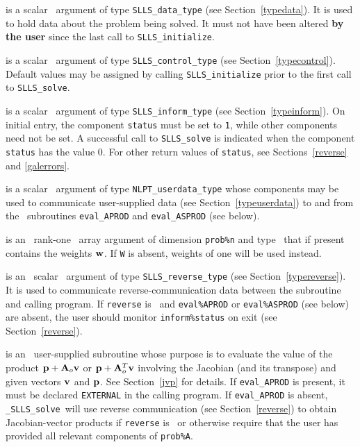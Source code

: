 \documentclass{galahad}
\newcommand{\packagename}{SLLS}
\newcommand{\fullpackagename}{\libraryname\_\packagename}
\newcommand{\solver}{{\tt \fullpackagename\_solve}}
\begin{document}
\begin{description}
 is a scalar \intentinout\ argument of type
{\tt \packagename\_data\_type}
(see Section~\ref{typedata}). It is used to hold data about the problem being
solved. It must not have been altered {\bf by the user} since the last call to
{\tt \packagename\_initialize}.

 is a scalar \intentin\ argument of type
{\tt \packagename\_control\_type}
(see Section~\ref{typecontrol}). Default values may be assigned by calling
{\tt \packagename\_initialize} prior to the first call to
{\tt \packagename\_solve}.

 is a scalar \intentinout\ argument of type
{\tt \packagename\_inform\_type}
(see Section~\ref{typeinform}). On initial entry, the component {\tt status}
must be set to {\tt 1}, while other components need not be set.
A successful call to
{\tt \packagename\_solve}
is indicated when the  component {\tt status} has the value 0.
For other return values of {\tt status}, see Sections~\ref{reverse} and
\ref{galerrors}.

 is a scalar \intentinout\ argument of type
{\tt NLPT\_userdata\_type} whose components may be used
to communicate user-supplied data
(see Section~\ref{typeuserdata})
to and from the \optional\ subroutines
 {\tt eval\_APROD} and {\tt eval\_ASPROD} (see below).

 is an \optional\ rank-one \intentinout\ array argument of dimension 
{\tt prob\%n} and type \realdp\ that if present contains the weights
${\mathbf{w}}$. If {\tt W} is absent, weights of one will be used instead.

 is an \optional\ scalar \intentinout\ argument of type
{\tt \packagename\_reverse\_type}
(see Section~\ref{typereverse}).
It is used to communicate reverse-communication data between the
subroutine and calling program.
If {\tt reverse} is \present\ and {\tt eval\%APROD} or {\tt eval\%ASPROD}
(see below) are absent, the user should monitor {\tt inform\%status} on exit
(see Section~\ref{reverse}).

 is an \optional\
user-supplied subroutine whose purpose is to evaluate the value of the
product ${\mathbf{p}} + {\mathbf{A}}_o {\mathbf{v}}$ or ${\mathbf{p}} + {\mathbf{A}}_o^T {\mathbf{v}}$
involving the Jacobian (and its transpose) and given vectors ${\mathbf{v}}$ and ${\mathbf{p}}$.
See Section~\ref{jvp} for details.
If {\tt eval\_APROD} is present,
it must be declared {\tt EXTERNAL} in the calling program.
If {\tt eval\_APROD} is absent, \solver\ will use reverse communication
(see Section~\ref{reverse})
to obtain Jacobian-vector products if {\tt reverse} is \present\ or
otherwise require that the user has provided all relevant
components of {\tt prob\%A}.


\end{description}
\end{document}
